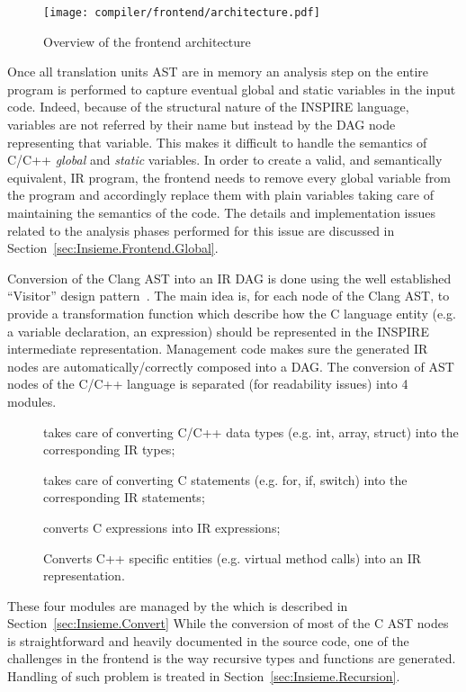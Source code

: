 \begin{figure}[tb]
	\centering
	\texttt{[image: compiler/frontend/architecture.pdf]}
	\caption{Overview of the frontend architecture}
	\label{fig:Frontend.Architecture}
\end{figure}

Once all translation units AST are in memory an analysis step on the entire
program is performed to capture eventual global and static variables in the
input code.  Indeed, because of the structural nature of the INSPIRE language,
variables are not referred by their name but instead by the DAG node
representing that variable. This makes it difficult to handle the semantics of
C/C++ \emph{global} and \emph{static} variables. In order to create a valid, and
semantically equivalent, IR program, the frontend needs to remove every global
variable from the program and accordingly replace them with plain variables
taking care of maintaining the semantics of the code. The details and
implementation issues related to the analysis phases performed for this issue
are discussed in Section~\ref{sec:Insieme.Frontend.Global}. 

Conversion of the Clang AST into an IR DAG is done using the well established
``Visitor'' design pattern~\cite{visitor-pattern}. The main idea is, for each
node of the Clang AST, to provide a transformation function which describe how
the C language entity (e.g. a variable declaration, an expression) should be
represented in the INSPIRE intermediate representation.  Management code makes
sure the generated IR nodes are automatically/correctly composed into a DAG. The
conversion of AST nodes of the C/C++ language is separated (for readability
issues) into 4 modules. 
\begin{description}
\item [] takes care of converting C/C++ data types (e.g. int,
array, struct) into the
corresponding IR types;
\item [] takes care of converting C statements (e.g. for, if,
switch) into the corresponding IR statements;
\item [] converts C expressions into IR expressions;
\item [] Converts C++ specific entities (e.g. virtual method
calls) into an IR representation.
\end{description}
These four modules are managed by the  which is described
in Section~\ref{sec:Insieme.Convert}
While the conversion of most of the C AST nodes is straightforward and heavily
documented in the source code, one of the challenges in the frontend is the way
recursive types and functions are generated. Handling of such problem is treated
in Section~\ref{sec:Insieme.Recursion}.

